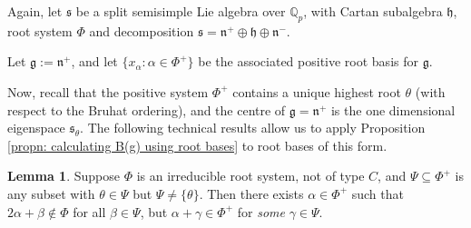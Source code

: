 \documentclass[12pt,a4paper]{article}
\theoremstyle{definition}
\newtheorem{lem}[thm]{Lemma}
\theoremstyle{remark}
\theoremstyle{custthm}
\begin{document}
Again, let $\mathfrak{s}$ be a split semisimple Lie algebra over $\mathbb{Q}_p$, with Cartan subalgebra $\mathfrak{h}$, root system $\Phi$ and decomposition $\mathfrak{s}=\mathfrak{n}^+\oplus\mathfrak{h}\oplus\mathfrak{n}^-$.

Let $\mathfrak{g}:=\mathfrak{n}^+$, and let $\{x_{\alpha}:\alpha\in\Phi^+\}$ be the associated positive root basis for $\mathfrak{g}$.


Now, recall that the positive system $\Phi^+$ contains a unique highest root $\theta$ (with respect to the Bruhat ordering), and the centre of $\mathfrak{g}=\mathfrak{n}^+$ is the one dimensional eigenspace $\mathfrak{s}_{\theta}$. The following technical results allow us to apply Proposition \ref{propn: calculating B(g) using root bases} to root bases of this form.

\begin{lem}\label{lem: eliminating root systems}
Suppose $\Phi$ is an irreducible root system, not of type $C$, and $\Psi\subseteq \Phi^+$ is any subset with $\theta\in\Psi$ but $\Psi\neq\{\theta\}$. Then there exists $\alpha\in\Phi^+$ such that $2\alpha+\beta\notin\Phi$ for all $\beta\in\Psi$, but $\alpha+\gamma\in\Phi^+$ for \emph{some} $\gamma\in\Psi$.
\end{lem}
\end{document}
